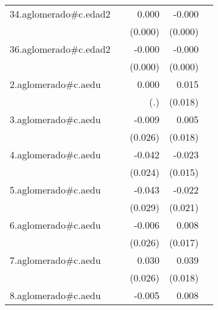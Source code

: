 {\begin{longtable}{l*{4}{D{.}{.}{-1}}}
\addlinespace
34.aglomerado#c.edad2&                     &       0.000         &      -0.000         &                     \\
            &                     &     (0.000)         &     (0.000)         &                     \\
\addlinespace
36.aglomerado#c.edad2&                     &      -0.000         &      -0.000\sym{**} &                     \\
            &                     &     (0.000)         &     (0.000)         &                     \\
\addlinespace
2.aglomerado#c.aedu&                     &       0.000         &       0.015         &                     \\
            &                     &         (.)         &     (0.018)         &                     \\
\addlinespace
3.aglomerado#c.aedu&                     &      -0.009         &       0.005         &                     \\
            &                     &     (0.026)         &     (0.018)         &                     \\
\addlinespace
4.aglomerado#c.aedu&                     &      -0.042         &      -0.023         &                     \\
            &                     &     (0.024)         &     (0.015)         &                     \\
\addlinespace
5.aglomerado#c.aedu&                     &      -0.043         &      -0.022         &                     \\
            &                     &     (0.029)         &     (0.021)         &                     \\
\addlinespace
6.aglomerado#c.aedu&                     &      -0.006         &       0.008         &                     \\
            &                     &     (0.026)         &     (0.017)         &                     \\
\addlinespace
7.aglomerado#c.aedu&                     &       0.030         &       0.039\sym{*}  &                     \\
            &                     &     (0.026)         &     (0.018)         &                     \\
\addlinespace
8.aglomerado#c.aedu&                     &      -0.005         &       0.008         &                     \\

\end{longtable}}
